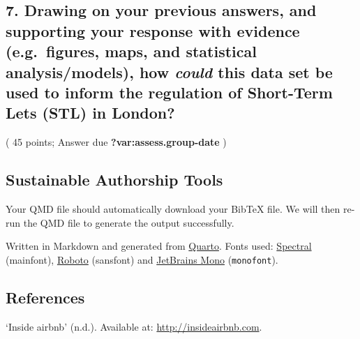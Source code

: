 \documentclass[
  a4paper,
  DIV=11,
  numbers=noendperiod]{scrartcl}
\newlength{\cslhangindent}
\newlength{\cslentryspacingunit} %
\newenvironment{CSLReferences}[2] %
 {%
  \setlength{\parindent}{0pt}
  \ifodd #1
  \let\oldpar\par
  \def\par{\hangindent=\cslhangindent\oldpar}
  \fi
  \setlength{\parskip}{#2\cslentryspacingunit}
 }%
 {}
\begin{document}
\hypertarget{drawing-on-your-previous-answers-and-supporting-your-response-with-evidence-e.g.-figures-maps-and-statistical-analysismodels-how-could-this-data-set-be-used-to-inform-the-regulation-of-short-term-lets-stl-in-london}{%
\subsection{\texorpdfstring{7. Drawing on your previous answers, and
supporting your response with evidence (e.g.~figures, maps, and
statistical analysis/models), how \emph{could} this data set be used to
inform the regulation of Short-Term Lets (STL) in
London?}{7. Drawing on your previous answers, and supporting your response with evidence (e.g.~figures, maps, and statistical analysis/models), how could this data set be used to inform the regulation of Short-Term Lets (STL) in London?}}\label{drawing-on-your-previous-answers-and-supporting-your-response-with-evidence-e.g.-figures-maps-and-statistical-analysismodels-how-could-this-data-set-be-used-to-inform-the-regulation-of-short-term-lets-stl-in-london}}

( 45 points; Answer due \textbf{?var:assess.group-date} )

\hypertarget{sustainable-authorship-tools}{%
\subsection{Sustainable Authorship
Tools}\label{sustainable-authorship-tools}}

Your QMD file should automatically download your BibTeX file. We will
then re-run the QMD file to generate the output successfully.

Written in Markdown and generated from
\href{https://quarto.org/}{Quarto}. Fonts used:
\href{https://fonts.google.com/specimen/Spectral}{Spectral} (mainfont),
\href{https://fonts.google.com/specimen/Roboto}{Roboto} ({sansfont}) and
\href{https://fonts.google.com/specimen/JetBrains\%20Mono}{JetBrains
Mono} (\texttt{monofont}).

\hypertarget{references}{%
\subsection*{References}\label{references}}

\hypertarget{refs}{}
\begin{CSLReferences}{0}{0}
\leavevmode{}%
{`Inside airbnb'} (n.d.). Available at: \url{http://insideairbnb.com}.

\end{CSLReferences}
\end{document}
